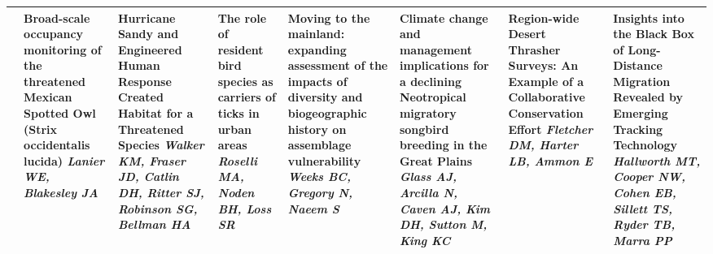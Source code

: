 \begin{tabular}{|x{0.85cm}|x{2.85cm}|x{2.85cm}|x{2.85cm}|x{2.85cm}|x{2.85cm}|a{2.85cm}|x{2.85cm}|}
&Broad-scale occupancy monitoring of the threatened Mexican Spotted Owl (Strix occidentalis lucida) \newline \newline \textit{Lanier WE, Blakesley JA} & Hurricane Sandy and Engineered Human Response Created Habitat for a Threatened Species \newline \newline \textit{Walker KM, Fraser JD, Catlin DH, Ritter SJ, Robinson SG, Bellman HA} & The role of resident bird species as carriers of ticks in urban areas \newline \newline \textit{Roselli MA, Noden BH, Loss SR} & Moving to the mainland: expanding assessment of the impacts of diversity and biogeographic history on assemblage vulnerability \newline \newline \textit{Weeks BC, Gregory N, Naeem S} & Climate change and management implications for a declining Neotropical migratory songbird breeding in the Great Plains \newline \newline \textit{Glass AJ, Arcilla N, Caven AJ, Kim DH, Sutton M, King KC} & Region-wide Desert Thrasher Surveys: An Example of a Collaborative Conservation Effort \newline \newline \textit{Fletcher DM, Harter LB, Ammon E} & Insights into the Black Box of Long-Distance Migration Revealed by Emerging Tracking Technology \newline \newline \textit{Hallworth MT, Cooper NW, Cohen EB, Sillett TS, Ryder TB, Marra PP}\\
\hline

\end{tabular}
